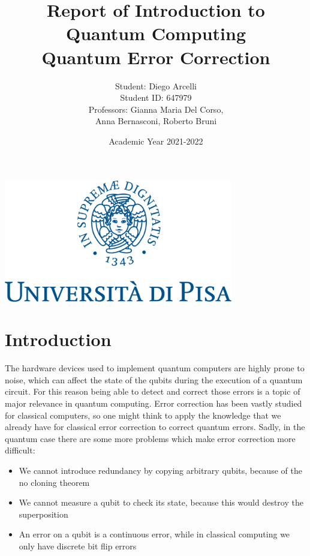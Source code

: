 \documentclass{article}
\begin{document}
	
	\begin{titlepage}
		
		\title{Report of Introduction to Quantum Computing \\ Quantum Error Correction}
		\author{Student: Diego Arcelli\\ Student ID: 647979 \\
			Professors: Gianna Maria Del Corso,\\Anna Bernasconi, Roberto Bruni}
		\date{Academic Year 2021-2022}
		\maketitle
		\centering
		\includegraphics[width=10cm]{./images/unipi_logo.png}
		
	\end{titlepage}
	\newpage
	
	\section{Introduction}
	 
	The hardware devices used to implement quantum computers are highly prone to noise, which can affect the state of the qubits during the execution of a quantum circuit. For this reason being able to detect and correct those errors is a topic of major relevance in quantum computing. Error correction has been vastly studied for classical computers, so one might think to apply the knowledge that we already have for classical error correction to correct quantum errors. Sadly, in the quantum case there are some more problems which make error correction more difficult:
	\begin{itemize}
		\item We cannot introduce redundancy by copying arbitrary qubits, because of the no cloning theorem
		\item We cannot measure a qubit to check its state, because this would destroy the superposition
		\item An error on a qubit is a continuous error, while in classical computing we only have discrete bit flip errors
	\end{itemize}	
	
\end{document}
